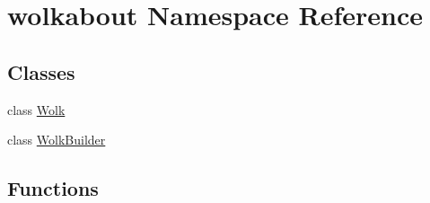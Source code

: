 \hypertarget{namespacewolkabout}{}\section{wolkabout Namespace Reference}
\label{namespacewolkabout}
\subsection*{Classes}
\begin{DoxyCompactItemize}
\item 
class \hyperlink{classwolkabout_1_1_wolk}{Wolk}
\item 
class \hyperlink{classwolkabout_1_1_wolk_builder}{Wolk\+Builder}
\end{DoxyCompactItemize}
\subsection*{Functions}
